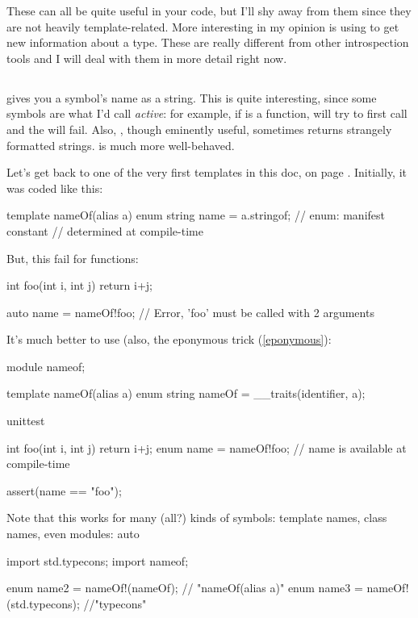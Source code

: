 These can all be quite useful in your code, but I'll shy away from them since they are not heavily template-related. More interesting in my opinion is using  to get new information about a type. These are really different from other introspection tools and I will deal with them in more detail right now.

\subsection{}

 gives you a symbol's name as a string. This is quite interesting, since some symbols are what I'd call \emph{active}: for example, if  is a function,  will try to first call  and the  will fail. Also, , though eminently useful, sometimes returns strangely formatted strings.  is much more well-behaved.

Let's get back to one of the very first templates in this doc,  on page \pageref{templatedeclarationexamples}. Initially, it was coded like this:

\begin{dcode}
template nameOf(alias a)
{
    enum string name = a.stringof; // enum: manifest constant
                                   // determined at compile-time
}
\end{dcode}

But, this fail for functions:

\begin{dcode}
int foo(int i, int j) { return i+j;}

auto name = nameOf!foo; // Error, 'foo' must be called with 2 arguments
\end{dcode}

It's much better to use  (also, the eponymous trick (\ref{eponymous}):

\begin{dcode}
module nameof;

template nameOf(alias a)
{
    enum string nameOf = __traits(identifier, a);
}

unittest
{
    int foo(int i, int j) { return i+j;}
    enum name = nameOf!foo; // name is available at compile-time

    assert(name == "foo");
}
\end{dcode}

Note that this works for many (all?) kinds of symbols: template names, class names, even modules:
auto
\begin{dcode}
import std.typecons;
import nameof;

enum name2 = nameOf!(nameOf); // "nameOf(alias a)"
enum name3 = nameOf!(std.typecons); //"typecons"
\end{dcode}

